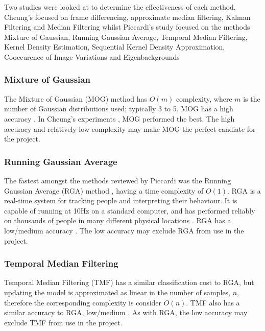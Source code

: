 Two studies were looked at to determine the effectiveness of each method. Cheung's \cite{Cheung2007} focused on frame differencing, approximate median filtering, Kalman Filtering and Median Filtering whilst Piccardi's study \cite{Piccardi2004} focused on the methods Mixture of Gaussian, Running Gaussian Average, Temporal Median Filtering, Kernel Density Estimation, Sequential Kernel Density Approximation, Cooccurence of Image Variations and Eigenbackgrounds \\

\subsubsection{Mixture of Gaussian}
The Mixture of Gaussian (MOG) method \cite{Stauffer1999} has $O(m)$ complexity, where $m$ is the number of Gaussian distributions used; typically 3 to 5. MOG has a high accuracy \cite{Piccardi2004}. In Cheung's experiments \cite{Cheung2007}, MOG performed the best. The high accuracy and relatively low complexity may make MOG the perfect candiate for the project.\\

\subsubsection{Running Gaussian Average}
The fastest amongst the methods reviewed by Piccardi was the Running Gaussian Average (RGA) method \cite{Wren1997,Koller1994}, having a time complexity of $O(1)$. RGA is a real-time system for tracking people and interpreting their behaviour. It is capable of running at 10Hz on a standard computer, and has performed reliably on thousands of people in many different physical locations \cite{Wren1997}. RGA has a low/medium accuracy \cite{Piccardi2004}. The low accuracy may exclude RGA from use in the project.\\

\subsubsection{Temporal Median Filtering}
Temporal Median Filtering (TMF) \cite{Lo2001,Cucchiara2003} has a similar classification cost to RGA, but updating the model is approximated as linear in the number of samples, $n$, therefore the corresponding complexity is consider $O(n)$. TMF also has a similar accuracy to RGA, low/medium \cite{Piccardi2004}. As with RGA, the low accuracy may exclude TMF from use in the project.\\


